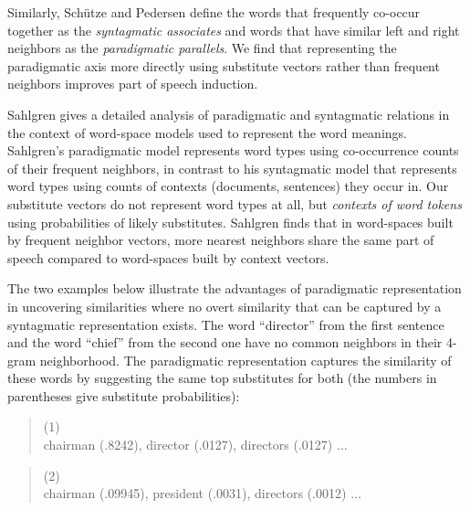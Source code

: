 Similarly, Sch{\"u}tze and Pedersen  define the
words that frequently co-occur together as the {\em syntagmatic
  associates} and words that have similar left and right neighbors as
the {\em paradigmatic parallels}.  We find that representing the
paradigmatic axis more directly using substitute vectors rather than
frequent neighbors improves part of speech induction.

Sahlgren  gives a detailed analysis of
paradigmatic and syntagmatic relations in the context of word-space
models used to represent the word meanings.  Sahlgren's paradigmatic
model represents word types using co-occurrence counts of their
frequent neighbors, in contrast to his syntagmatic model that
represents word types using counts of contexts (documents, sentences)
they occur in.  Our substitute vectors do not represent word types at
all, but {\em contexts of word tokens} using probabilities of likely
substitutes.  Sahlgren finds that in word-spaces built by frequent
neighbor vectors, more nearest neighbors share the same part of speech
compared to word-spaces built by context vectors.

The two examples below illustrate the advantages of paradigmatic
representation in uncovering similarities where no overt similarity
that can be captured by a syntagmatic representation exists.  The word
``director'' from the first sentence and the word ``chief'' from the
second one have no common neighbors in their 4-gram neighborhood.  The
paradigmatic representation captures the similarity of these words by
suggesting the same top substitutes for both (the numbers in
parentheses give substitute probabilities):
\begin{quote}
  (1) \\
   chairman (.8242), director (.0127),
  directors (.0127) $\ldots$
\end{quote}

\begin{quote}
  (2) \\
   chairman (.09945), president (.0031),
  directors (.0012) $\ldots$
\end{quote}

